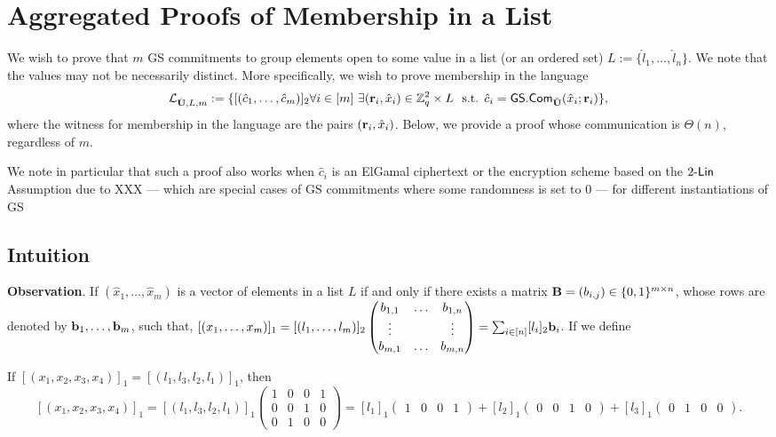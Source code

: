 \section{Aggregated Proofs of Membership in a List} \label{sec:list-memb}

We wish to prove that $m$ GS commitments to group elements open to some value in a list (or an ordered set) $L:=\{\hat{l}_1,\ldots,\hat{l}_n\}$. We note that the values may not be necessarily distinct. 
More specifically, we wish to prove membership in the language
$$
\Lang_{\hmatr{U},L,m}:=\{[(\hat{c}_1,\ldots,\hat{c}_m)]_2 \forall i\in[m] \ \exists (\vecb{r}_i,\hat{x}_i) \in \Z_q^2 \times L \ \text{ s.t. } \hat{c}_i=\GScom(\hat{x}_i;\vecb{r}_i)\},
$$
where the witness for membership in the language are the pairs  $(\mathbf{r}_i,\hat{x}_i)$. Below, we provide a proof whose communication is $\Theta(n)$, regardless of $m$. 

We note in particular that such a proof also works when $\hat{c}_i$ is an ElGamal ciphertext or the encryption scheme based on the $2\mbox{-}\mathsf{Lin}$ Assumption due to XXX --- which are special  cases of GS commitments where some randomness is set to $0$ --- for different instantiations of GS 


\subsection{Intuition}

\textbf{Observation}. If $(\hat{x}_1,\ldots, \hat{x}_m)$ is a vector of elements in a list $L$ if and only if there exists a matrix 
$\mathbf{{B}}=(b_{i,j})\in \{0,1\}^{m \times n}$, whose rows are denoted by 
$\mathbf{b}_1,\ldots,\mathbf{b}_m$, such that, 
 $[(x_1,\ldots, x_m)]_1= [(l_1,\ldots, l_m)]_2 \begin{pmatrix} b_{1,1} & \ldots & b_{1,n} \\
\vdots & & \vdots  
\\
b_{m,1} & \ldots & b_{m,n}
\end{pmatrix} = \sum_{i \in [n]} [l_i]_2 \mathbf{b}_i $.  If we define 

\begin{example} If  $[(x_1,x_2,x_3, x_4)]_1=
[(l_1,l_3,l_2,l_1)]_1$, then 
$$[(x_1,x_2,x_3, x_4)]_1 = [(l_1,l_3,l_2,l_1)]_1\begin{pmatrix} 1 & 0 & 0 & 1\\
	0 & 0 & 1 & 0\\
	0 & 1 & 0 & 0
\end{pmatrix}= [l_1]_1 \begin{pmatrix} 1 & 0 & 0 & 1
\end{pmatrix} + [l_2]_1  \begin{pmatrix} 0 & 0 & 1 & 0
\end{pmatrix} + [l_3]_1 \begin{pmatrix} 0 & 1 & 0 & 0
\end{pmatrix}.$$

\end{example} 

